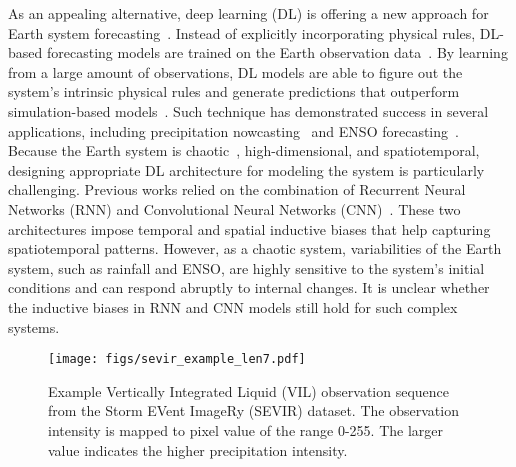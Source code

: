 \documentclass{article}
\begin{document}
As an appealing alternative, 
deep learning (DL) is offering a new approach for Earth system forecasting~\cite{reichstein2019deep}. Instead of explicitly incorporating physical rules, DL-based forecasting models are trained on the Earth observation data~\cite{shi2015convolutional}. 
By learning from a large amount of observations, DL models are able to figure out the system's intrinsic physical rules and generate predictions that outperform simulation-based models~\cite{espeholt2021skillful}. 
Such technique has demonstrated success in several applications, including precipitation nowcasting~\cite{ravuri2021skilful,de2020rainbench} and ENSO forecasting~\cite{ham2019deep}.
Because the Earth system is chaotic~\cite{letellier2019chaos}, high-dimensional, and spatiotemporal, designing appropriate DL architecture for modeling the system is particularly challenging. Previous works relied on the combination of Recurrent Neural Networks (RNN) and Convolutional Neural Networks (CNN)~\cite{shi2015convolutional, shi2017deep, veillette2020sevir, guen2020disentangling, wang2022predrnn}. These two architectures impose temporal and spatial inductive biases that help capturing spatiotemporal patterns. However, as a chaotic system, variabilities of the Earth system, such as rainfall and ENSO, are highly sensitive to the system's initial conditions and can respond abruptly to internal changes. It is unclear whether the inductive biases in RNN and CNN models still hold for such complex systems.









\begin{figure}[!tb]
    \centering
    \vskip -0.8cm
    \texttt{[image: figs/sevir\_example\_len7.pdf]}
    \vskip -0.2cm
    \caption{Example Vertically Integrated Liquid (VIL) observation sequence from the Storm EVent ImageRy (SEVIR) dataset. The observation intensity is mapped to pixel value of the range 0-255. The larger value indicates the higher precipitation intensity.}
    \label{fig:sevir_example}
    \vskip -0.6cm
\end{figure}
\end{document}

